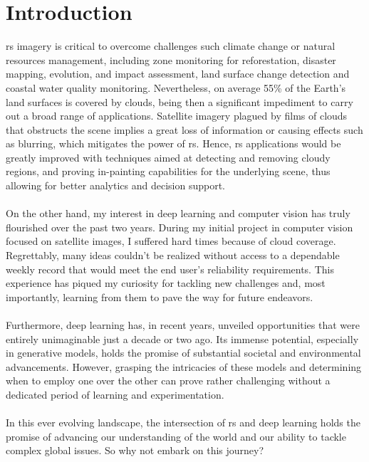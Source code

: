 \documentclass[11pt, a4paper]{article}
\begin{document}
	\part{Introduction} 
	\gls{rs} imagery is critical to overcome challenges such climate change or natural resources management, including zone monitoring for reforestation, disaster mapping, evolution, and impact assessment, land surface change detection and coastal water quality monitoring.  
	Nevertheless, on average 55\% of the Earth's land surfaces is covered by clouds, being then a significant impediment to carry out a broad range of applications. Satellite imagery plagued by films of clouds that obstructs the scene implies a great loss of information or causing effects such as blurring, which mitigates the power of \gls{rs}. Hence, \gls{rs} applications would be greatly improved with techniques aimed at detecting and removing cloudy regions, and proving in-painting capabilities for the underlying scene, thus allowing for better analytics and decision support.
	\\
	\\
	On the other hand, my interest in deep learning and computer vision has truly flourished over the past two years. During my initial project in computer vision focused on satellite images, I suffered hard times because of cloud coverage. Regrettably, many ideas couldn't be realized without access to a dependable weekly record that would meet the end user's reliability requirements. This experience has piqued my curiosity for tackling new challenges and, most importantly, learning from them to pave the way for future endeavors. 
	\\
	\\
	Furthermore, deep learning has, in recent years, unveiled opportunities that were entirely unimaginable just a decade or two ago. Its immense potential, especially in generative models, holds the promise of substantial societal and environmental advancements. However, grasping the intricacies of these models and determining when to employ one over the other can prove rather challenging without a dedicated period of learning and experimentation. 
	\\
	\\
	In this ever evolving landscape, the intersection of \gls{rs} and deep learning holds the promise of advancing our understanding of the world and our ability to tackle complex global issues. So why not embark on this journey?
	\newpage
\end{document}
